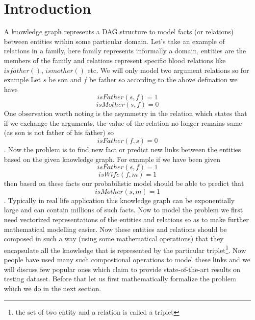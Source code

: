 \documentclass[12pt]{article}
\begin{document}
\section{Introduction}
A knowledge graph represents a DAG structure to model facts (or relations) between entities within some particular domain. Let's take an example of relations in a family, here family represents informally a domain, entities are the members of the family and relations represent specific blood relations like $isfather()$, $ismother()$ etc. We will only model two argument relations so for example Let $s$ be son and $f$ be father so according to the above defination we have
\[
isFather(s, f)=1
\]
\[
isMother(s, f)=0
\]One observation worth noting is the asymmetry in the relation which states that if we exchange the arguments, the value of the relation no longer remains same (as son is not father of his father) so 
\[
isFather(f, s)=0
\]
. Now the problem is to find new fact or predict new links between the entities based on the given knowledge graph. For example if we have been given 
\[
isFather(s, f)=1
\]
\[
isWife(f, m)=1
\] then based on these facts our probabilistic model should be able to predict that 
\[
isMother(s, m)=1
\]. Typically in real life application this knowledge graph can be exponentially large and can contain millions of such facts. Now to model the problem we first need vectorized representations of the entities and relations so as to make further mathematical modelling easier. Now these entities and relations should be composed in such a way (using some mathematical operations) that they encapsulate all the knowledge that is represented by the particular triplet\footnote{the set of two entity and a relation is called a triplet}. Now people have used many such compostional operations to model these links and we will discuss few popular ones which claim to provide state-of-the-art results on testing dataset. Before that let us first mathematically formalize the problem which we do in the next section. 
\end{document}
